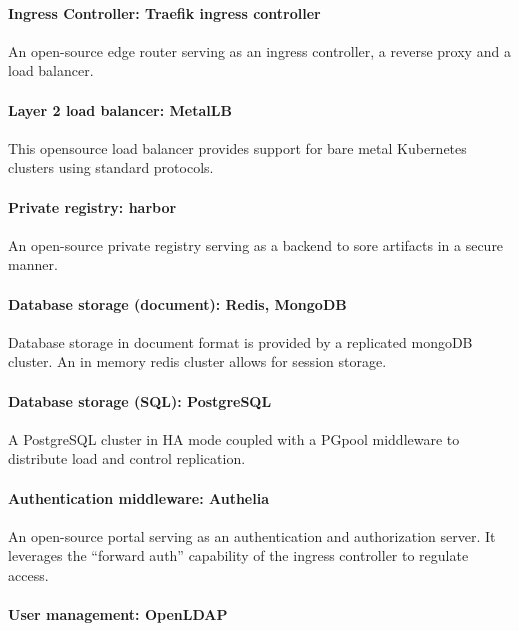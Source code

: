 \paragraph{Ingress Controller: Traefik ingress controller }

An open-source edge router serving as an ingress controller, a reverse proxy and a load balancer. 

\paragraph{Layer 2 load balancer: MetalLB }

This opensource load balancer provides support for bare metal Kubernetes clusters using standard protocols. 

\paragraph{Private registry: harbor }

An open-source private registry serving as a backend to sore artifacts in a secure manner. 

\paragraph{Database storage (document): Redis, MongoDB }

Database storage in document format is provided by a replicated mongoDB cluster. An in memory redis cluster allows for session storage. 

\paragraph{Database storage (SQL): PostgreSQL }

A PostgreSQL cluster in HA mode coupled with a PGpool middleware to distribute load and control replication. 

\paragraph{Authentication middleware: Authelia }

An open-source portal serving as an authentication and authorization server. It leverages the “forward auth” capability of the ingress controller to regulate access. 

\paragraph{User management: OpenLDAP }

